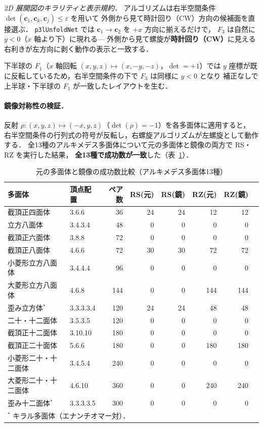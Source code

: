 \documentclass[12pt,a4paper]{article}
\theoremstyle{definition}
\begin{document}
\emph{2D 展開図のキラリティと表示規約．}
アルゴリズムは右半空間条件 $\det(\mathbf{c}_1,\mathbf{c}_k,\mathbf{c}_j) \le \varepsilon$ を用いて
外側から見て時計回り（CW）方向の候補面を直接選ぶ．
\texttt{p3lUnfoldNet} では $\mathbf{c}_1 \to \mathbf{c}_2$ を $+x$ 方向に揃えるだけで，
$F_3$ は自然に $y < 0$（$x$ 軸より下）に現れる—
外側から見て螺旋が\textbf{時計回り（CW）}に見える右利きが左方向に剥く動作の表示と一致する．

下半球の $F_1$（$x$ 軸回転 $(x,y,z)\mapsto(x,-y,-z)$，$\det=+1$）では
$y$ 座標が既に反転しているため，右半空間条件の下で $F_3$ は同様に $y<0$ となり
補正なしで上半球・下半球の $F_1$ が一致したレイアウトを生む．

\paragraph{鏡像対称性の検証．}
反射 $\rho\colon(x,y,z)\mapsto(-x,y,z)$（$\det(\rho)=-1$）を各多面体に適用すると，
右半空間条件の行列式の符号が反転し，右螺旋アルゴリズムが左螺旋として動作する．
全13種のアルキメデス多面体について元の多面体と鏡像の両方で RS・RZ を実行した結果，
\textbf{全13種で成功数が一致}した（表~\ref{tab:mirror}）．

\begin{table}[h]
\centering
\caption{元の多面体と鏡像の成功数比較（アルキメデス多面体13種）}
\label{tab:mirror}
\small
\begin{tabular}{llrrrrrr}
\toprule
多面体 & 頂点配置 & ペア数 & RS(元) & RS(鏡) & RZ(元) & RZ(鏡) \\
\midrule
截頂正四面体   & 3.6.6     &  36 & 24 & 24 & 12 & 12 \\
立方八面体     & 3.4.3.4   &  48 &  0 &  0 &  0 &  0 \\
截頂正六面体   & 3.8.8     &  72 &  0 &  0 &  0 &  0 \\
截頂正八面体   & 4.6.6     &  72 & 30 & 30 & 72 & 72 \\
小菱形立方八面体 & 3.4.4.4  &  96 &  0 &  0 &  0 &  0 \\
大菱形立方八面体 & 4.6.8    & 144 &  0 &  0 &144 &144 \\
歪み立方体$^*$ & 3.3.3.3.4 & 120 & 24 & 24 & 48 & 48 \\
二十・十二面体  & 3.5.3.5   & 120 &  0 &  0 &  0 &  0 \\
截頂正十二面体  & 3.10.10   & 180 &  0 &  0 &  0 &  0 \\
截頂正二十面体  & 5.6.6     & 180 &  0 &  0 &180 &180 \\
小菱形二十・十二面体 & 3.4.5.4 & 240 & 0 & 0 & 0 & 0 \\
大菱形二十・十二面体 & 4.6.10 & 360 &  0 &  0 &240 &240 \\
歪み十二面体$^*$ & 3.3.3.3.5 & 300 &  0 &  0 &  0 &  0 \\
\bottomrule
\multicolumn{7}{l}{\small$^*$ キラル多面体（エナンチオマー対）．}
\end{tabular}
\end{table}
\end{document}

